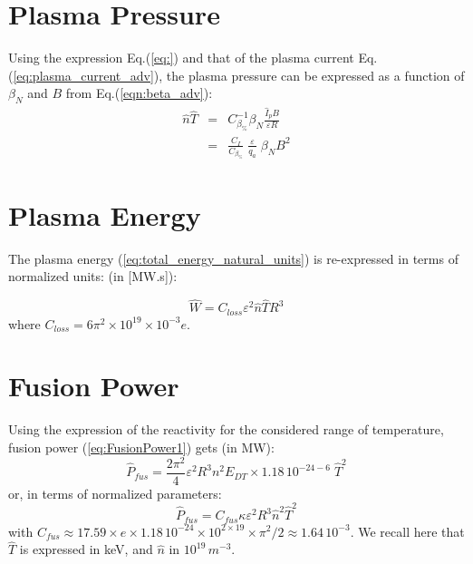 \section{Plasma Pressure}
Using the expression Eq.(\ref{eq:}) and that of the plasma current Eq.(\ref{eq:plasma_current_adv}), the plasma pressure can be expressed as a function of $\beta_N$ and $B$ from Eq.(\ref{eqn:beta_adv}):
\begin{eqnarray}
\hat n\hat T &=& C_{\beta_\%}^{-1} \beta_N \frac{\hat I_p B}{\varepsilon R} \nonumber \\
&=& \frac{C_I}{C_{\beta_\%}}\; \frac{\varepsilon}{q_a} \;  \beta_N B^2
\label{eqn:nT_betaN_adv}
\end{eqnarray}

\section{Plasma Energy}
The plasma energy (\ref{eq:total_energy_natural_units}) is re-expressed in terms of normalized units: (in [MW.s]):

\begin{equation}
\hat W = C_{loss}  \varepsilon^2  \hat n \hat T R^3
\label{eq:total_energy}
\end{equation}
where $C_{loss} = 6 \pi^2 \times 10^{19} \times 10^{-3} e$.



\section{Fusion Power}
Using the expression of the reactivity for the considered range of temperature, fusion power (\ref{eq:FusionPower1}) gets (in MW):
\begin{equation}
\hat P_{fus} 
=
\frac{2\pi^2}{4}
\varepsilon^2 R^3
n^2 E_{DT}
\times
1.18\, 10^{-24-6}\; \hat T^2 
\end{equation}
or, in terms of normalized parameters:
\begin{equation}
\boxed{
	\hat P_{fus} 
	=
	C_{fus} \kappa \varepsilon^2 R^3 \hat n^2 \hat T^2
}
\label{eq:DT_fusion_power_adv}
\end{equation}
with $C_{fus} \approx 17.59 \times e\times 1.18\, 10^{-24} \times 10^{2\times19}\times \pi^2/2 \approx 1.64\, 10^{-3}$. We recall here that $\hat T$ is expressed in keV, and $\hat n$ in $10^{19} \, \si{m^{-3}}$. 



